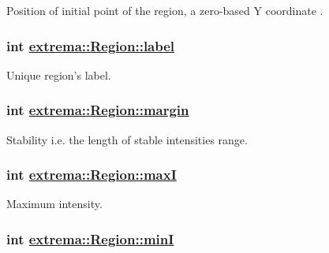 Position of initial point of the region, a zero-based Y coordinate . 

\hypertarget{structextrema_1_1Region_d0ec4b02009e61677ecf09f2931b7a45}{
\subsubsection[label]{\setlength{\rightskip}{0pt plus 5cm}int \hyperlink{structextrema_1_1Region_d0ec4b02009e61677ecf09f2931b7a45}{extrema::Region::label}}}
\label{structextrema_1_1Region_d0ec4b02009e61677ecf09f2931b7a45}


Unique region's label. 

\hypertarget{structextrema_1_1Region_ff74e77ae3765704b06fbc76e8b8d4cf}{
\subsubsection[margin]{\setlength{\rightskip}{0pt plus 5cm}int \hyperlink{structextrema_1_1Region_ff74e77ae3765704b06fbc76e8b8d4cf}{extrema::Region::margin}}}
\label{structextrema_1_1Region_ff74e77ae3765704b06fbc76e8b8d4cf}


Stability i.e. the length of stable intensities range. 

\hypertarget{structextrema_1_1Region_287284a6ae0cc41e3db3d78cbbe91b2c}{
\subsubsection[maxI]{\setlength{\rightskip}{0pt plus 5cm}int \hyperlink{structextrema_1_1Region_287284a6ae0cc41e3db3d78cbbe91b2c}{extrema::Region::max\-I}}}
\label{structextrema_1_1Region_287284a6ae0cc41e3db3d78cbbe91b2c}


Maximum intensity. 

\hypertarget{structextrema_1_1Region_1e0837d519914c5bb629e9908d2ff476}{
\subsubsection[minI]{\setlength{\rightskip}{0pt plus 5cm}int \hyperlink{structextrema_1_1Region_1e0837d519914c5bb629e9908d2ff476}{extrema::Region::min\-I}}}
\label{structextrema_1_1Region_1e0837d519914c5bb629e9908d2ff476}


